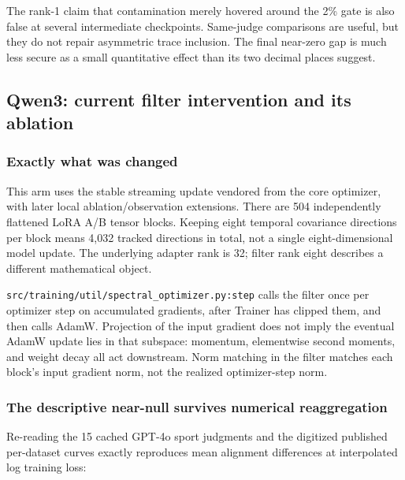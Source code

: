 \documentclass[
  british,
  10pt,
  a4paper,
]{article}
\begin{document}
The rank-1 claim that contamination merely hovered around the 2\% gate
is also false at several intermediate checkpoints.\allowbreak{}
Same-judge comparisons are useful, but they do not repair asymmetric
trace inclusion. The final near-zero gap is much less secure as a small
quantitative effect than its two decimal places suggest.

\subsection{Qwen3: current filter intervention and its
ablation}\label{em-results-audit--qwen3-current-filter-intervention-and-its-ablation}

\subsubsection{Exactly what was
changed}\label{em-results-audit--exactly-what-was-changed}

This arm uses the stable streaming update vendored from the core
optimizer, with later local ablation/\allowbreak{}observation
extensions.\allowbreak{} There are 504 independently flattened LoRA A/B
tensor blocks. Keeping eight temporal covariance directions per block
means 4,032 tracked directions in total, not a single
eight-\allowbreak{}dimensional model update. The underlying adapter rank
is 32; filter rank eight describes a different mathematical object.

\texttt{src/\allowbreak{}training/\allowbreak{}util/\allowbreak{}spectral\_\allowbreak{}optimizer.\allowbreak{}py:\allowbreak{}step}
calls the filter once per optimizer step on accumulated gradients, after
Trainer has clipped them, and then calls AdamW. Projection of the input
gradient does not imply the eventual AdamW update lies in that subspace:
momentum, elementwise second moments, and weight decay all act
downstream.\allowbreak{} Norm matching in the filter matches each
block's input gradient norm, not the realized
optimizer-\allowbreak{}step norm.

\subsubsection{The descriptive near-null survives numerical
reaggregation}\label{em-results-audit--the-descriptive-near-null-survives-numerical-reaggregation}

Re-reading the 15 cached GPT-4o sport judgments and the digitized
published per-\allowbreak{}dataset curves exactly reproduces mean
alignment differences at interpolated log training loss:
\end{document}
